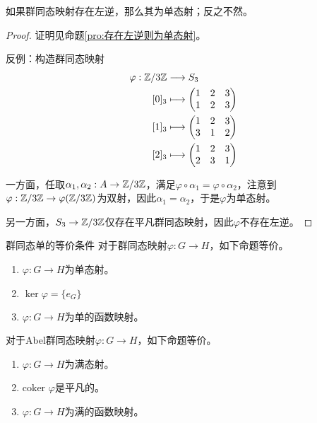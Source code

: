 \begin{proposition}
	如果群同态映射存在左逆，那么其为单态射；反之不然。
\end{proposition}

\begin{proof}
	证明见命题\ref{pro:存在左逆则为单态射}。
	
	反例：构造群同态映射
	\begin{align*}
		\varphi:\begin{aligned}[t]
			\mathbb{Z}/3\mathbb{Z}&\longrightarrow S_3\\
			[0]_3&\longmapsto\begin{pmatrix}1&2&3\\1&2&3\end{pmatrix}\\
			[1]_3&\longmapsto\begin{pmatrix}1&2&3\\3&1&2\end{pmatrix}\\
			[2]_3&\longmapsto\begin{pmatrix}1&2&3\\2&3&1\end{pmatrix}
		\end{aligned}
	\end{align*}

	一方面，任取$\alpha_1,\alpha_2:A\to \mathbb{Z}/3\mathbb{Z}$，满足$\varphi\circ \alpha_1=\varphi\circ \alpha_2$，注意到$\varphi:\mathbb{Z}/3\mathbb{Z}\to \varphi(\mathbb{Z}/3\mathbb{Z})$为双射，因此$\alpha_1=\alpha_2$，于是$\varphi$为单态射。
	
	另一方面，$S_3\to \mathbb{Z}/3\mathbb{Z}$仅存在平凡群同态映射，因此$\varphi$不存在左逆。
\end{proof}

\begin{proposition}{}{群同态单的等价条件}
	对于群同态映射$\varphi:G\to H$，如下命题等价。
	\begin{enumerate}
		\item $\varphi:G\to H$为单态射。
		\item $\ker\varphi=\{e_G\}$
		\item $\varphi:G\to H$为单的函数映射。
	\end{enumerate}
\end{proposition}

\begin{proposition}
	对于Abel群同态映射$\varphi:G\to H$，如下命题等价。
	\begin{enumerate}
		\item $\varphi:G\to H$为满态射。
		\item $\text{coker }\varphi$是平凡的。
		\item $\varphi:G\to H$为满的函数映射。
	\end{enumerate}
\end{proposition}

